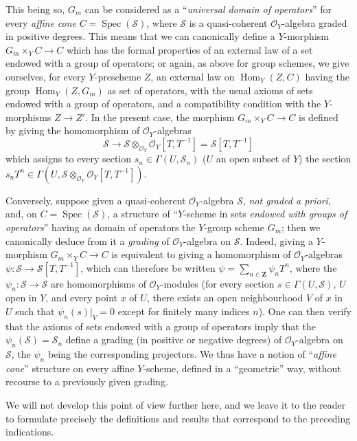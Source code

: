\begin{remark}[8.3.9]
This being so, $G_m$ can be considered as a ``\emph{universal domain of
operators}'' for every \emph{affine cone}
$C=\operatorname{Spec}(\mathcal{S})$, where $\mathcal{S}$ is a
quasi-coherent $\mathcal{O}_Y$-algebra graded in positive degrees. This
means that we can canonically define a $Y$-morphism
$G_m\times_YC\to C$ which has the formal properties of an external law of a
set endowed with a group of operators; or again, as above for
group schemes, we give ourselves, for every $Y$-prescheme $Z$, an external law
on $\operatorname{Hom}_Y(Z,C)$ having the group
$\operatorname{Hom}_Y(Z,G_m)$ as set of operators, with the usual
axioms of sets endowed with a group of operators, and a compatibility
condition with the $Y$-morphisms $Z\to Z'$. In the present case, the
morphism $G_m\times_YC\to C$ is defined by giving the homomorphism of
$\mathcal{O}_Y$-algebras
\[
  \mathcal{S}\to
  \mathcal{S}\otimes_{\mathcal{O}_Y}\mathcal{O}_Y[T,T^{-1}]
  =\mathcal{S}[T,T^{-1}]
\]
which assigns to every section $s_n\in\Gamma(U,\mathcal{S}_n)$ ($U$ an open
subset of $Y$) the section
$s_nT^n\in\Gamma(U,\mathcal{S}\otimes_{\mathcal{O}_Y}
\mathcal{O}_Y[T,T^{-1}])$.

Conversely, suppose given a quasi-coherent $\mathcal{O}_Y$-algebra
$\mathcal{S}$, \emph{not graded a priori}, and, on
$C=\operatorname{Spec}(\mathcal{S})$, a structure of ``$Y$-scheme in
sets \emph{endowed with groups of operators}'' having as domain
of operators the $Y$-group scheme $G_m$; then we canonically deduce from it
a \emph{grading} of $\mathcal{O}_Y$-algebra on
$\mathcal{S}$. Indeed, giving a $Y$-morphism $G_m\times_YC\to C$
is equivalent to giving a homomorphism of $\mathcal{O}_Y$-algebras
$\psi:\mathcal{S}\to\mathcal{S}[T,T^{-1}]$, which can therefore be written
$\psi=\sum_{n\in\mathbf{Z}}\psi_nT^n$, where the
$\psi_n:\mathcal{S}\to\mathcal{S}$ are homomorphisms of
$\mathcal{O}_Y$-modules (for every section $s\in\Gamma(U,\mathcal{S})$, $U$ open in $Y$,
and every point $x$ of $U$, there exists an open neighbourhood $V$ of $x$ in $U$
such that $\psi_n(s)|_V=0$ except for finitely many indices $n$). One can
then verify that the axioms of sets endowed with a group of operators
imply that the $\psi_n(\mathcal{S})=\mathcal{S}_n$ define a
grading (in positive or negative degrees) of $\mathcal{O}_Y$-algebra on
$\mathcal{S}$, the $\psi_n$ being the corresponding projectors. We thus have
a notion of ``\emph{affine cone}'' structure on every affine $Y$-scheme,
defined in a ``geometric'' way, without recourse to a previously given grading.

We will not develop this point of view further here, and we leave it to the
reader to formulate precisely the definitions and results that
correspond to the preceding indications.
\end{remark}

